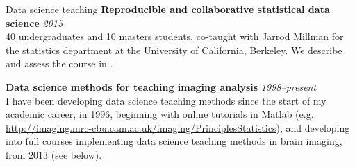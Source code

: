 \documentclass{cv}
\newcommand{\PlaceDateNote}[3]{{\bf #1} \hfill {\em #2} \\#3}
\newcommand{\UCB}{University of California, Berkeley}
\begin{document}
\begin{cvSection}{Data science teaching}
\PlaceDateNote{Reproducible and collaborative statistical data science}{2015}
    {40 undergraduates and 10 masters students, co-taught with Jarrod Millman
    for the statistics department at the \UCB.  We describe and assess the course
    in \cite{millman2018rcsds}.}

\PlaceDateNote{Data science methods for teaching imaging
    analysis}{1998--present}
    {I have been developing data science teaching methods since the start of
    my academic career, in 1996, beginning with online tutorials in Matlab
    (e.g.
    \url{http://imaging.mrc-cbu.cam.ac.uk/imaging/PrinciplesStatistics}), and
    developing into full courses implementing data science teaching methods in
    brain imaging, from 2013 (see below).}

\end{cvSection}
\end{document}
